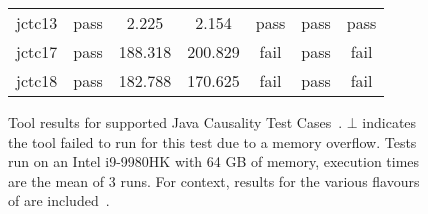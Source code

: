 \begin{figure}[t]
\begin{center}
\begin{tabularx}{0.8\textwidth}{c||c|c|c|c|c|c}
    jctc13                           & pass   & 2.225     & 2.154     & pass    & pass    & pass   \\
    jctc17                           & pass   & 188.318   & 200.829   & fail    & pass    & fail   \\
    jctc18                           & pass   & 182.788   & 170.625   & fail    & pass    & fail   \\
  \end{tabularx}
  \caption{\label{fig:tool} Tool results for supported Java Causality Test Cases~\cite{PughWebsite}. $\bot$ indicates the tool failed to run for this test due to a memory overflow. Tests run on an Intel i9-9980HK with 64 GB of memory, execution times are the mean of 3 runs. For context, results for the various flavours of \MRD{} are included~\cite{DBLP:conf/esop/PaviottiCPWOB20}.}
\end{center}
\end{figure}

